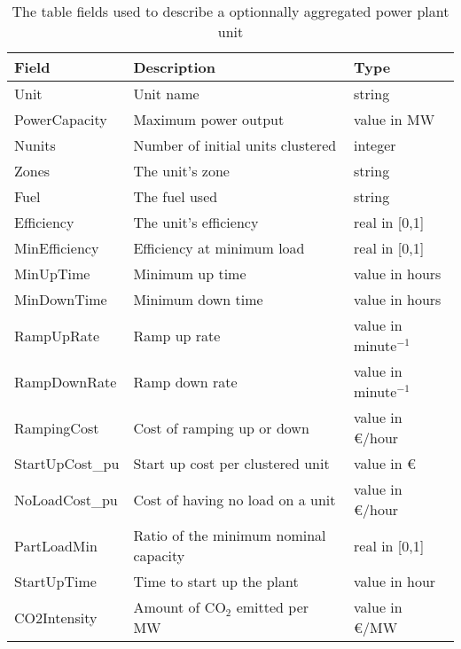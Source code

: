 \begin{table}[h]
    \centering
    \begin{tabular}{|l l l|}
        \hline
        Field           & Description                       & Type                    \\ \hline
        Unit            & Unit name                         & string                  \\
        PowerCapacity   & Maximum power output              & value in MW             \\
        Nunits          & Number of initial units clustered & integer                 \\
        Zones           & The unit's zone                   & string                  \\
        Fuel            & The fuel used                     & string                  \\
        Efficiency      & The unit's efficiency             & real in [0,1]           \\
        MinEfficiency   & Efficiency at minimum load        & real in [0,1]           \\
        MinUpTime       & Minimum up time                   & value in hours          \\
        MinDownTime     & Minimum down time                 & value in hours          \\
        RampUpRate      & Ramp up rate                      & value in minute$^{-1}$  \\
        RampDownRate    & Ramp down rate                    & value in minute$^{-1}$  \\
        RampingCost     & Cost of ramping up or down        & value in €/hour         \\
        StartUpCost\_pu & Start up cost per clustered unit  & value in €              \\
        NoLoadCost\_pu  & Cost of having no load on a unit  & value in €/hour         \\
        PartLoadMin     & Ratio of the minimum nominal capacity & real in [0,1]       \\
        StartUpTime     & Time to start up the plant        & value in hour           \\
        CO2Intensity    & Amount of CO$_2$ emitted per MW   & value in €/MW           \\ \hline
    \end{tabular}
    \caption{The table fields used to describe a optionnally aggregated power plant unit}
    \label{table:plant-db}
\end{table}

